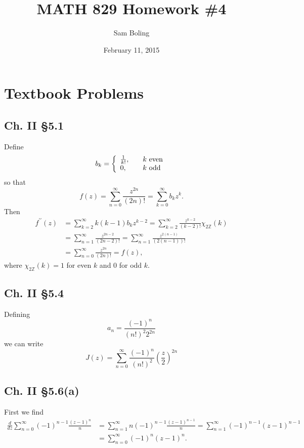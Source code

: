 \documentclass{article}
\title{MATH 829 Homework \#4}
\date{February 11, 2015}
\author{Sam Boling}
\newcounter{Problem}
\begin{document}
\begin{titlepage}
\maketitle
\end{titlepage}

\section{Textbook Problems}

\subsection*{Ch. II \S 5.1}
Define
$$
b_k
=
\left\{\begin{array}{l l}
  \frac{1}{k!}, & \quad k \text{ even} \\
  0,            & \quad k \text{ odd}
\end{array}\right.
$$
so that
$$
f(z) = \sum_{n=0}^{\infty} \frac{z^{2n}}{(2n)!} = \sum_{k=0}^\infty b_k z^k.
$$
Then
\begin{align*}
   f^{\prime\prime}(z)
&= \sum_{k=2}^\infty k (k-1) b_k z^{k-2}
 = \sum_{k=2}^\infty \frac{z^{k-2}}{(k-2)!} \chi_{2\mathbb{Z}}(k) \\
&= \sum_{n=1}^\infty \frac{z^{2n - 2}}{(2n - 2)!}
 = \sum_{n=1}^\infty \frac{z^{2(n-1)}}{(2(n-1))!} \\
&= \sum_{n=0}^\infty \frac{z^{2n}}{(2n)!}
 = f(z),
\end{align*}
where $\chi_{2\mathbb{Z}}(k) = 1$ for even $k$ and 0 for odd $k$.

\subsection*{Ch. II \S 5.4}
Defining
$$
a_n = \frac{(-1)^n}{(n!)^2 2^{2n}}
$$
we can write
$$
J(z) = \sum_{n=0}^\infty \frac{(-1)^n}{(n!)^2}\left(\frac{z}{2}\right)^{2n}
$$

\subsection*{Ch. II \S 5.6(a)}
First we find
\begin{align*}
   \frac{d}{dz} \sum_{n=0}^\infty (-1)^{n-1} \frac{(z-1)^n}{n}
&= \sum_{n=1}^\infty n (-1)^{n-1} \frac{(z-1)^{n-1}}{n}
 = \sum_{n=1}^\infty (-1)^{n-1} (z-1)^{n-1} \\
&= \sum_{n=0}^\infty (-1)^n (z-1)^n.
\end{align*}
\end{document}

